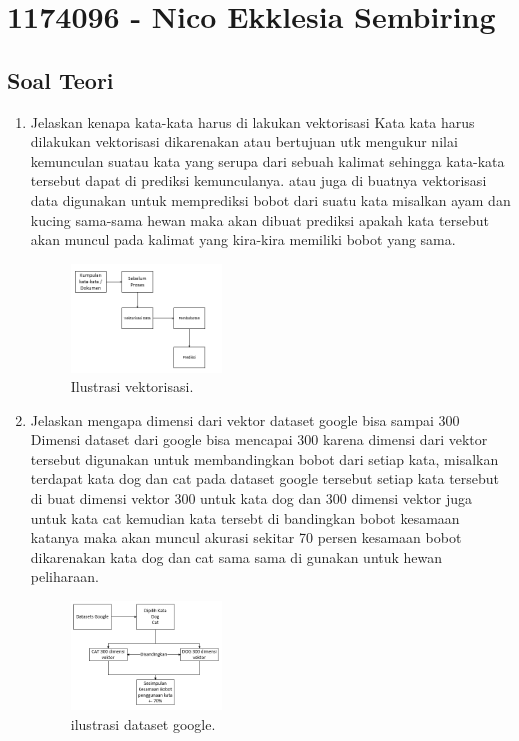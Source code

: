 \section{1174096 - Nico Ekklesia Sembiring}
\subsection{Soal Teori}
\begin{enumerate}

	\item Jelaskan kenapa kata-kata harus di lakukan vektorisasi
	\hfill\break
	Kata kata harus dilakukan vektorisasi dikarenakan atau bertujuan utk mengukur nilai kemunculan suatau kata yang serupa dari sebuah kalimat sehingga kata-kata tersebut dapat di prediksi kemunculanya. atau juga di buatnya vektorisasi data digunakan untuk memprediksi bobot dari suatu kata misalkan ayam dan kucing sama-sama hewan maka akan dibuat prediksi apakah kata tersebut akan muncul pada kalimat yang kira-kira memiliki bobot yang sama.
	
    \begin{figure}[H]
	\centering
		\includegraphics[width=4cm]{figures/1174096/tugas5/1-1.PNG}
		\caption{Ilustrasi vektorisasi.}
	\end{figure}

	\item Jelaskan mengapa dimensi dari vektor dataset google bisa sampai 300
	\hfill\break
    Dimensi dataset dari google bisa mencapai 300 karena dimensi dari vektor tersebut digunakan untuk membandingkan bobot dari setiap kata, misalkan terdapat kata dog dan cat pada dataset google tersebut setiap kata tersebut di buat dimensi vektor 300 untuk kata dog dan 300 dimensi vektor juga untuk kata cat kemudian kata tersebt di bandingkan bobot kesamaan katanya maka akan muncul akurasi sekitar 70 persen kesamaan bobot dikarenakan kata dog dan cat sama sama di gunakan untuk hewan peliharaan.
	
    \begin{figure}[H]
	\centering
		\includegraphics[width=4cm]{figures/1174096/tugas5/1-2.PNG}
		\caption{ilustrasi dataset google.}
	\end{figure}



\end{enumerate}
